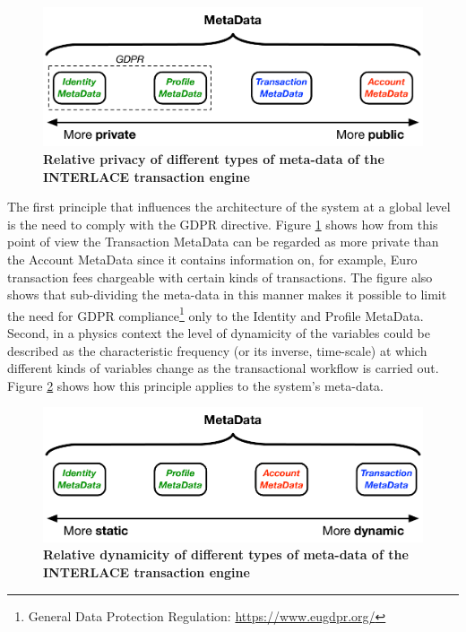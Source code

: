 \begin{figure}[h]
\vspace{-0.5cm}
\centering
\includegraphics[width=12cm]{Figures/Private_Public_MetaData}
\caption{\small\textbf{Relative privacy of different types of meta-data of the INTERLACE transaction engine}}
\label{fig:privatepublicmetaData}
\vspace{-0.5cm}
\end{figure}

The first principle that influences the architecture of the system at a global level is the need to comply with the GDPR directive. Figure \ref{fig:privatepublicmetaData} shows how from this point of view the Transaction MetaData can be regarded as more private than the Account MetaData since it contains information on, for example, Euro transaction fees chargeable with certain kinds of transactions. The figure also shows that sub-dividing the meta-data in this manner makes it possible to limit the need for GDPR compliance\footnote{General Data Protection Regulation: \url{https://www.eugdpr.org/}} only to the Identity and Profile MetaData. Second, in a physics context the level of dynamicity of the variables could be described as the characteristic frequency (or its inverse, time-scale) at which different kinds of variables change as the transactional workflow is carried out. Figure \ref{fig:staticdynamicmetadata} shows how this principle applies to the system's meta-data.

\begin{figure}[h]
\vspace{-0.5cm}
\centering
\includegraphics[width=12cm]{Figures/Static_Dynamic_MetaData}
\caption{\small\textbf{Relative dynamicity of different types of meta-data of the INTERLACE transaction engine}}
\label{fig:staticdynamicmetadata}
\vspace{-0.5cm}
\end{figure}

